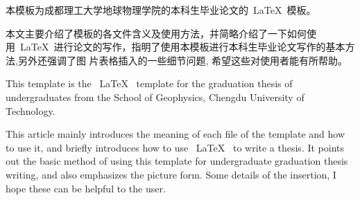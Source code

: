 \begin{cnabstract}
本模板为成都理工大学地球物理学院的本科生毕业论文的~\LaTeX~模板。

本文主要介绍了模板的各文件含义及使用方法，并简略介绍了一下如何使用~\LaTeX~进行论文的写作，指明了使用本模板进行本科生毕业论文写作的基本方法,另外还强调了图
片表格插入的一些细节问题, 希望这些对使用者能有所帮助。
\end{cnabstract}
\vspace{1em}\par


\begin{enabstract}
This template is the ~\LaTeX~ template for the graduation thesis of undergraduates from the School of Geophysics, Chengdu University of Technology.

This article mainly introduces the meaning of each file of the template and how to use it, and briefly introduces how to use ~\LaTeX~ to write a thesis. It points out the basic method of using this template for undergraduate graduation thesis writing, and also emphasizes the picture form. Some details of the insertion, I hope these can be helpful to the user.
\end{enabstract}
\vspace{1em}\par



